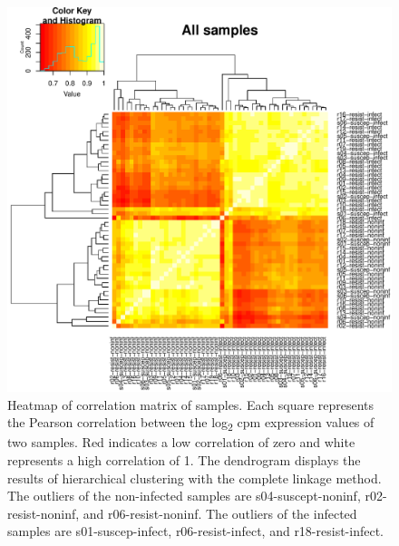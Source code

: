 \documentclass[fleqn,10pt]{wlscirep}
\begin{document}
\begin{figure}[ht]
\centering
\includegraphics[width=\linewidth]{../figure/heatmap-all-samples.pdf}
\caption{
Heatmap of correlation matrix of samples. Each square represents the
Pearson correlation between the log\textsubscript{2} cpm expression
values of two samples. Red indicates a low correlation of zero and
white represents a high correlation of 1. The dendrogram displays the
results of hierarchical clustering with the complete linkage method.
The outliers of the non-infected samples are s04-suscept-noninf,
r02-resist-noninf, and r06-resist-noninf. The outliers of the infected
samples are s01-suscep-infect, r06-resist-infect, and
r18-resist-infect.
}
\label{fig:heat-all}
\end{figure}
\end{document}
